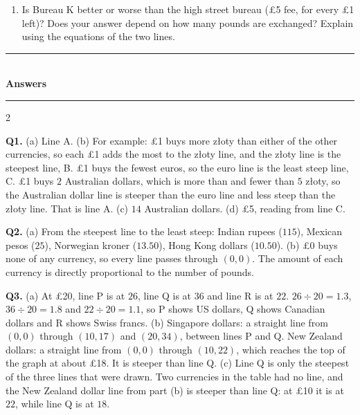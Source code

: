 \documentclass[12pt,a4paper]{article}
\newcommand{\zl}{z\l{}oty}
\newcommand{\heading}[1]{%
  \vspace{2pt}
  {\color{blue!45!black}\rule{\linewidth}{1pt}}\\[1pt]
  {\large\bfseries #1}\\[-6pt]
  {\color{blue!45!black}\rule{\linewidth}{0.4pt}}
  \vspace{2pt}}
\begin{document}
\begin{enumerate}[resume]
\begin{enumerate}
        \vspace{9em}
  \item Is Bureau K better or worse than the high street bureau (\pounds5 fee,
         for every \pounds1 left)? Does your answer depend on how
        many pounds are exchanged? Explain using the equations of the two
        lines.

        \vspace{12em}
\end{enumerate}

\end{enumerate}

\newpage

\heading{Answers}

{\small
\begin{multicols}{2}
\raggedcolumns
\setlength{\parskip}{4pt}

\textbf{Q1.} (a) Line A. \quad
(b) For example: \pounds1 buys more \zl{} than either of the other currencies,
so each \pounds1 adds the most to the \zl{} line, and the \zl{} line is the
steepest line, B. \pounds1 buys the fewest euros, so the euro line is the least
steep line, C. \pounds1 buys $2$ Australian dollars, which is more than
 and fewer than $5$ \zl{}, so the Australian dollar line is
steeper than the euro line and less steep than the \zl{} line. That is line A.
\quad
(c) $14$ Australian dollars. \quad
(d) \pounds5, reading from line C.

\textbf{Q2.} (a) From the steepest line to the least steep: Indian rupees
($115$), Mexican pesos ($25$), Norwegian kroner ($13.50$), Hong Kong dollars
($10.50$). \quad
(b) \pounds0 buys none of any currency, so every line passes through $(0,0)$.
The amount of each currency is directly proportional to the number of pounds.

\textbf{Q3.} (a) At \pounds20, line P is at $26$, line Q is at $36$ and line R
is at $22$. $26\div20=1.3$, $36\div20=1.8$ and $22\div20=1.1$, so P shows US
dollars, Q shows Canadian dollars and R shows Swiss francs. \quad
(b) Singapore dollars: a straight line from $(0,0)$ through $(10,17)$ and
$(20,34)$, between lines P and Q. New Zealand dollars: a straight line from
$(0,0)$ through $(10,22)$, which reaches the top of the graph at about
\pounds18. It is steeper than line Q. \quad
(c) Line Q is only the steepest of the three lines that were drawn. Two
currencies in the table had no line, and the New Zealand dollar line from part
(b) is steeper than line Q: at \pounds10 it is at $22$, while line Q is at
$18$.


\end{multicols}}
\end{document}

